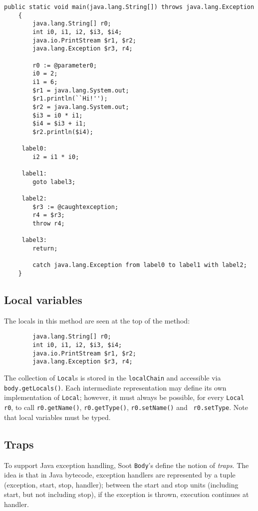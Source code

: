 \documentclass{article}
\begin{document}
\begin{verbatim}
public static void main(java.lang.String[]) throws java.lang.Exception
    {
        java.lang.String[] r0;
        int i0, i1, i2, $i3, $i4;
        java.io.PrintStream $r1, $r2;
        java.lang.Exception $r3, r4;

        r0 := @parameter0;
        i0 = 2;
        i1 = 6;
        $r1 = java.lang.System.out;
        $r1.println(``Hi!'');
        $r2 = java.lang.System.out;
        $i3 = i0 * i1;
        $i4 = $i3 + i1;
        $r2.println($i4);

     label0:
        i2 = i1 * i0;

     label1:
        goto label3;

     label2:
        $r3 := @caughtexception;
        r4 = $r3;
        throw r4;

     label3:
        return;

        catch java.lang.Exception from label0 to label1 with label2;
    }
\end{verbatim}

\subsection{Local variables}

The locals in this method are seen at the top of the method:
\begin{verbatim}
        java.lang.String[] r0;
        int i0, i1, i2, $i3, $i4;
        java.io.PrintStream $r1, $r2;
        java.lang.Exception $r3, r4;
\end{verbatim}

The collection of {\tt Local}s is stored in the {\tt localChain} and
accessible via {\tt body.getLocals()}.  Each intermediate
representation may define its own implementation of {\tt Local};
however, it must always be possible, for every {\tt Local r0}, to call
{\tt r0.getName()}, {\tt r0.getType()}, {\tt r0.setName()} and {\tt
r0.setType}.  Note that local variables must be typed.

\subsection{Traps}

To support Java exception handling, Soot {\tt Body}'s define the notion
of {\em traps}.  The idea is that in Java bytecode, exception handlers are
represented by a tuple (exception, start, stop, handler); between the start
and stop units (including start, but not including stop), if the exception is 
thrown, execution continues at handler.
\end{document}

